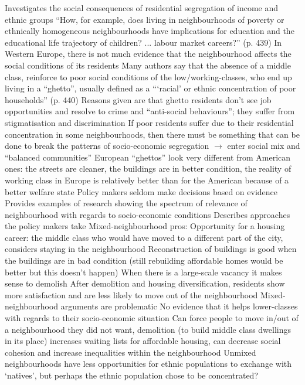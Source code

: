 \documentclass{article}
\begin{document}
\begin{outline}
	\1 Investigates the social consequences of residential segregation of income and ethnic groups
		\2 ``How, for example, does living in neighbourhoods of poverty or ethnically homogeneous neighbourhoods have implications for education and the educational life trajectory of children? ... labour market careers?'' (p. 439)
	\1 In Western Europe, there is not much evidence that the neighbourhood affects the social conditions of its residents
	\1 Many authors say that the absence of a middle class, reinforce to poor social conditions of the low/working-classes, who end up living in a ``ghetto'', usually defined as a ```racial' or ethnic concentration of poor households'' (p. 440)
		\2 Reasons given are that ghetto residents don't see job opportunities and resolve to crime and ``anti-social behaviours''; they suffer from stigmatisation and discrimination
	\1 If poor residents suffer due to their residential concentration in some neighbourhoods, then there must be something that can be done to break the patterns of socio-economic segregation $\rightarrow$ enter social mix and ``balanced communities''
	\1 European ``ghettos'' look very different from American ones: the streets are cleaner, the buildings are in better condition, the reality of working class in Europe is relatively better than for the American because of a better welfare state
	\1 Policy makers seldom make decisions based on evidence
		\2 Provides examples of research showing the spectrum of relevance of neighbourhood with regards to socio-economic conditions
		\2 Describes approaches the policy makers take
	\1 Mixed-neighbourhood pros:
		\2 Opportunity for a housing career: the middle class who would have moved to a different part of the city, considers staying in the neighbourhood
		\2 Reconstruction of buildings is good when the buildings are in bad condition (still rebuilding affordable homes would be better but this doesn't happen)
		\2 When there is a large-scale vacancy it makes sense to demolish
		\2 After demolition and housing diversification, residents show more satisfaction and are less likely to move out of the neighbourhood
	\1 Mixed-neighbourhood arguments are problematic
		\2 No evidence that it helps lower-classes with regards to their socio-economic situation
		\2 Can force people to move in/out of a neighbourhood they did not want, demolition (to build middle class dwellings in its place) increases waiting lists for affordable housing, can decrease social cohesion and increase inequalities within the neighbourhood
		\2 Unmixed neighbourhoods have less opportunities for ethnic populations to exchange with `natives', but perhaps the ethnic population chose to be concentrated? 

\end{outline}
\end{document}
